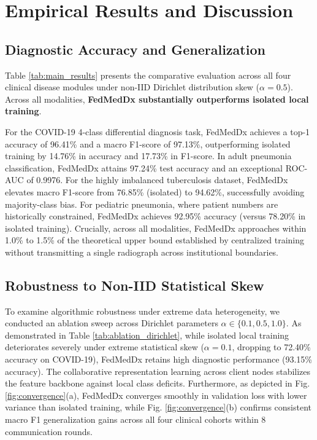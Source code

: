 \documentclass[conference]{IEEEtran}
\begin{document}
\section{Empirical Results and Discussion}

\subsection{Diagnostic Accuracy and Generalization}
Table \ref{tab:main_results} presents the comparative evaluation across all four clinical disease modules under non-IID Dirichlet distribution skew ($\alpha = 0.5$). Across all modalities, \textbf{FedMedDx substantially outperforms isolated local training}. 

For the COVID-19 4-class differential diagnosis task, FedMedDx achieves a top-1 accuracy of 96.41\% and a macro F1-score of 97.13\%, outperforming isolated training by 14.76\% in accuracy and 17.73\% in F1-score. In adult pneumonia classification, FedMedDx attains 97.24\% test accuracy and an exceptional ROC-AUC of 0.9976. For the highly imbalanced tuberculosis dataset, FedMedDx elevates macro F1-score from 76.85\% (isolated) to 94.62\%, successfully avoiding majority-class bias. For pediatric pneumonia, where patient numbers are historically constrained, FedMedDx achieves 92.95\% accuracy (versus 78.20\% in isolated training). Crucially, across all modalities, FedMedDx approaches within 1.0\% to 1.5\% of the theoretical upper bound established by centralized training without transmitting a single radiograph across institutional boundaries.

\subsection{Robustness to Non-IID Statistical Skew}
To examine algorithmic robustness under extreme data heterogeneity, we conducted an ablation sweep across Dirichlet parameters $\alpha \in \{0.1, 0.5, 1.0\}$. As demonstrated in Table \ref{tab:ablation_dirichlet}, while isolated local training deteriorates severely under extreme statistical skew ($\alpha = 0.1$, dropping to 72.40\% accuracy on COVID-19), FedMedDx retains high diagnostic performance (93.15\% accuracy). The collaborative representation learning across client nodes stabilizes the feature backbone against local class deficits. Furthermore, as depicted in Fig. \ref{fig:convergence}(a), FedMedDx converges smoothly in validation loss with lower variance than isolated training, while Fig. \ref{fig:convergence}(b) confirms consistent macro F1 generalization gains across all four clinical cohorts within 8 communication rounds.
\end{document}
